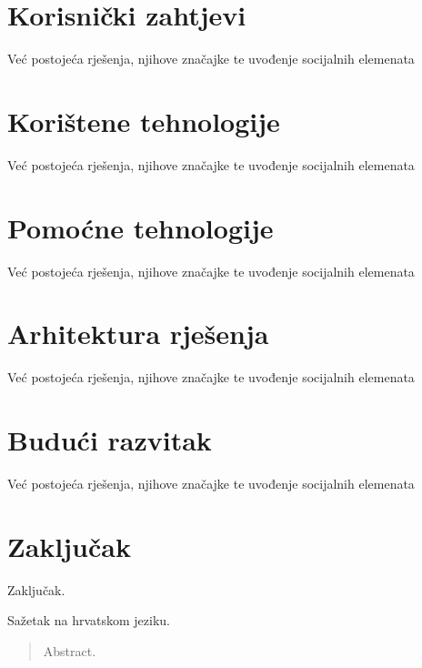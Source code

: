 \documentclass[times, utf8, zavrsni]{fer}
\begin{document}
\chapter{Korisnički zahtjevi}
Već postojeća rješenja, njihove značajke te uvođenje socijalnih elemenata

\chapter{Korištene tehnologije}
Već postojeća rješenja, njihove značajke te uvođenje socijalnih elemenata

\chapter{Pomoćne tehnologije}
Već postojeća rješenja, njihove značajke te uvođenje socijalnih elemenata

\chapter{Arhitektura rješenja}
Već postojeća rješenja, njihove značajke te uvođenje socijalnih elemenata

\chapter{Budući razvitak}
Već postojeća rješenja, njihove značajke te uvođenje socijalnih elemenata

\chapter{Zaključak}
Zaključak.




\begin{sazetak}
Sažetak na hrvatskom jeziku.

\end{sazetak}

\begin{abstract}
Abstract.

\end{abstract}
\end{document}
